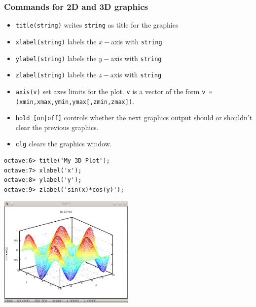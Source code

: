 \documentclass[slidestop,mathserif,compress,xcolor=svgnames]{beamer}
\begin{document}
\begin{frame}
  \frametitle{\small Commands for 2D and 3D graphics}
  \begin{itemize}
    \item \texttt{title(string)} writes \texttt{string} as title for the graphics
    \item \texttt{xlabel(string)} labels the $x-$axis with \texttt{string}
    \item \texttt{ylabel(string)} labels the $y-$axis with \texttt{string}
    \item \texttt{zlabel(string)} labels the $z-$axis with \texttt{string}
    \item \texttt{axis(v)} set axes limits for the plot. \texttt{v} is a vector of the form \texttt{v = (xmin,xmax,ymin,ymax[,zmin,zmax])}.
    \item \texttt{hold [on|off]} controls whether the next graphics output should or shouldn't clear the previous graphics.
    \item \texttt{clg} clears the graphics window.
  \end{itemize}
  \framebreak
  \begin{verbatim}
octave:6> title('My 3D Plot');
octave:7> xlabel('x');
octave:8> ylabel('y');
octave:9> zlabel('sin(x)*cos(y)');
  \end{verbatim}
  \begin{center}
    \includegraphics[width=0.5\textwidth]{./octave-plot-3d-title}
  \end{center}
\end{frame}
\end{document}

